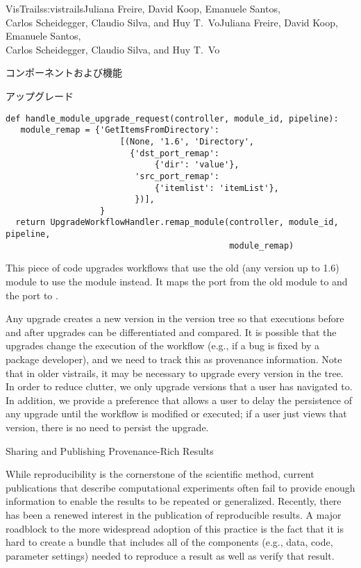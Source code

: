 \begin{aosachaptertoc}{VisTrails}{s:vistrails}{Juliana Freire, David Koop, Emanuele Santos, \\ Carlos Scheidegger, Claudio Silva, and Huy T.\ Vo}{Juliana Freire, David Koop, Emanuele Santos, \\ \hspace*{0.9cm} Carlos Scheidegger, Claudio Silva, and Huy T.\ Vo}
\begin{aosasect1}{コンポーネントおよび機能}
\begin{aosasect2}{アップグレード}
\begin{verbatim}
def handle_module_upgrade_request(controller, module_id, pipeline):
   module_remap = {'GetItemsFromDirectory':
                       [(None, '1.6', 'Directory',
                         {'dst_port_remap':
                              {'dir': 'value'},
                          'src_port_remap':
                              {'itemlist': 'itemList'},
                          })],
                   }
  return UpgradeWorkflowHandler.remap_module(controller, module_id, pipeline,
                                             module_remap)
\end{verbatim}

This piece of code upgrades workflows that use the old
 (any version up to 1.6) module to use the
 module instead.  It maps the  port from the
old module to  and the  port to
.

Any upgrade creates a new version in the version tree so that
executions before and after upgrades can be differentiated and
compared.  It is possible that the upgrades change the execution of
the workflow (e.g., if a bug is fixed by a package developer), and we
need to track this as provenance information.  Note that in older
vistrails, it may be necessary to upgrade every version in the tree.
In order to reduce clutter, we only upgrade versions that a user has
navigated to.  In addition, we provide a preference that allows a user
to delay the persistence of any upgrade until the workflow is modified
or executed; if a user just views that version, there is no need to
persist the upgrade.

\end{aosasect2}

\begin{aosasect2}{Sharing and Publishing Provenance-Rich Results}
\label{sec.vistrails.publish}

While reproducibility is the cornerstone of the scientific method,
current publications that describe computational experiments 
often fail to provide enough information to enable the results
to be repeated or generalized. Recently, there has been a renewed
interest in the publication of reproducible results. A major roadblock
to the more widespread adoption of this practice is the fact that it
is hard to create a bundle that includes all of the components (e.g.,
data, code, parameter settings) needed to reproduce a result as well
as verify that result.


\end{aosasect2}
\end{aosasect1}
\end{aosachaptertoc}
